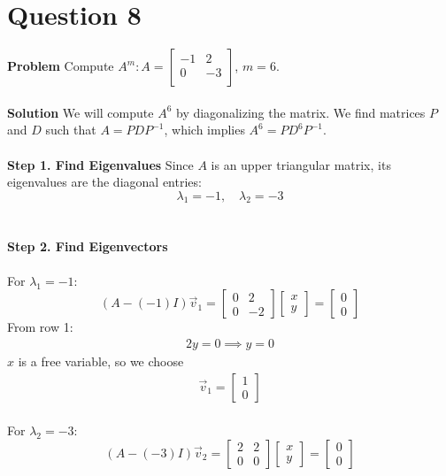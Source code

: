 \documentclass{article}
\begin{document}
\pagebreak


\section{Question 8}
\textbf{Problem}
Compute
$
	A^{m}:
	A = \begin{bmatrix}
		-1 & 2  \\
		0  & -3 \\
	\end{bmatrix}
$, $m = 6$.
\\
\\
\textbf{Solution}
We will compute $A^6$ by diagonalizing the matrix.
We find matrices $P$ and $D$ such that $A = PDP^{-1}$, which implies $A^6 = PD^6P^{-1}$.
\\
\\
\textbf{Step 1. Find Eigenvalues}
Since $A$ is an upper triangular matrix, its eigenvalues are the diagonal entries:
\[
	\lambda_{1} = -1, \quad \lambda_{2} = -3
\]
\\
\\
\textbf{Step 2. Find Eigenvectors}
\\
\\
For $\lambda_{1} = -1$:
\[
	(A - (-1)I)\vec{v}_{1} = \begin{bmatrix} 0 & 2 \\ 0 & -2 \end{bmatrix} \begin{bmatrix} x \\ y \end{bmatrix} = \begin{bmatrix} 0 \\ 0 \end{bmatrix}
\]
From row 1:
\begin{align*}
	2y = 0 \implies y=0
\end{align*}
$x$ is a free variable, so we choose
\begin{align*}
	\vec{v}_{1} =
	\begin{bmatrix}
		1 \\
		0
	\end{bmatrix}
\end{align*}
\\
For $\lambda_{2} = -3$:
\[
	(A - (-3)I)\vec{v}_{2} = \begin{bmatrix} 2 & 2 \\ 0 & 0 \end{bmatrix} \begin{bmatrix} x \\ y \end{bmatrix} = \begin{bmatrix} 0 \\ 0 \end{bmatrix}
\]
\end{document}
